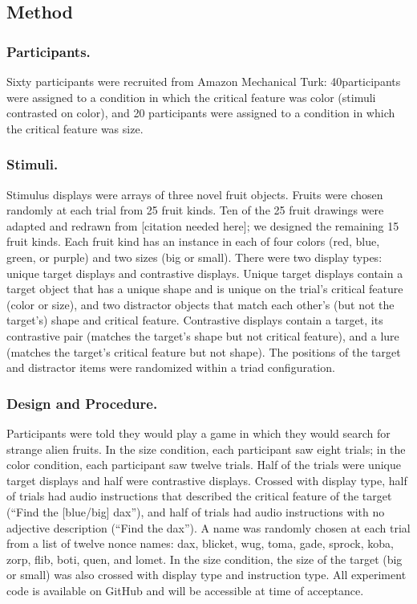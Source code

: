 \documentclass[10pt, letterpaper]{article}
\begin{document}
\subsection{Method}\label{method}

\subsubsection{Participants.}\label{participants.}

Sixty participants were recruited from Amazon Mechanical Turk:
40participants were assigned to a condition in which the critical
feature was color (stimuli contrasted on color), and 20 participants
were assigned to a condition in which the critical feature was size.

\subsubsection{Stimuli.}\label{stimuli.}

Stimulus displays were arrays of three novel fruit objects. Fruits were
chosen randomly at each trial from 25 fruit kinds. Ten of the 25 fruit
drawings were adapted and redrawn from {[}citation needed here{]}; we
designed the remaining 15 fruit kinds. Each fruit kind has an instance
in each of four colors (red, blue, green, or purple) and two sizes (big
or small). There were two display types: unique target displays and
contrastive displays. Unique target displays contain a target object
that has a unique shape and is unique on the trial's critical feature
(color or size), and two distractor objects that match each other's (but
not the target's) shape and critical feature. Contrastive displays
contain a target, its contrastive pair (matches the target's shape but
not critical feature), and a lure (matches the target's critical feature
but not shape). The positions of the target and distractor items were
randomized within a triad configuration.

\subsubsection{Design and Procedure.}\label{design-and-procedure.}

Participants were told they would play a game in which they would search
for strange alien fruits. In the size condition, each participant saw
eight trials; in the color condition, each participant saw twelve
trials. Half of the trials were unique target displays and half were
contrastive displays. Crossed with display type, half of trials had
audio instructions that described the critical feature of the target
(``Find the {[}blue/big{]} dax''), and half of trials had audio
instructions with no adjective description (``Find the dax''). A name
was randomly chosen at each trial from a list of twelve nonce names:
dax, blicket, wug, toma, gade, sprock, koba, zorp, flib, boti, quen, and
lomet. In the size condition, the size of the target (big or small) was
also crossed with display type and instruction type. All experiment code
is available on GitHub and will be accessible at time of acceptance.
\end{document}
